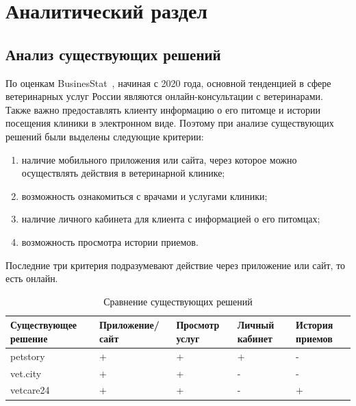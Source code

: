 \section{Аналитический раздел}

\subsection{Анализ существующих решений}

По оценкам BusinesStat~\cite{businesstat}, начиная с 2020 года, основной тенденцией в сфере ветеринарных услуг России являются онлайн-консультации с ветеринарами. Также важно предоставлять клиенту информацию о его питомце и истории посещения клиники в электронном виде. Поэтому при анализе существующих решений были выделены следующие критерии:
\begin{enumerate}[label*=---]
	\item наличие мобильного приложения или сайта, через которое можно осуществлять действия в ветеринарной клинике;
	\item возможность ознакомиться с врачами и услугами клиники;
 	\item наличие личного кабинета для клиента с информацией о его питомцах;
 	\item возможность просмотра истории приемов.
 \end{enumerate}

Последние три критерия подразумевают действие через приложение или сайт, то есть онлайн.

\begin{table}[hbtp]
	\begin{center}
		\begin{flushleft}
			\captionsetup{justification=raggedright, singlelinecheck=false}
			\caption{\label{tab:solve}Сравнение существующих решений}
		\end{flushleft}
		\begin{tabular}{|  p{} | p{} | p{}  |  p{} | p{}|} 
			\hline  Существующее решение & Приложение/ сайт & Просмотр услуг  & Личный кабинет & История приемов \\ \hline
			petstory~\cite{petstory} &   + &   + & + & - \\ \hline
			vet.city~\cite{vetcity} &   + &   + & - & -  \\ \hline
			vetcare24~\cite{vetcare24} &  + &  + & - & + \\ \hline
		\end{tabular}
	\end{center}
\end{table}

